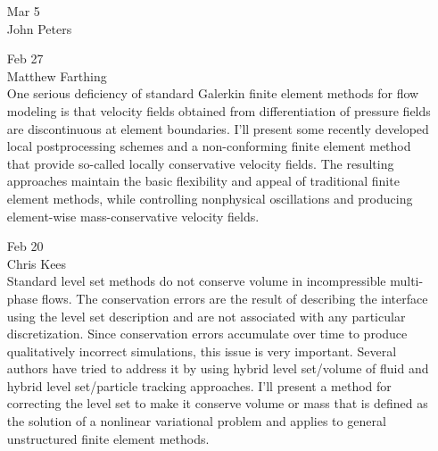 \documentclass[12]{article}
\begin{document}
\begin{enumerate}
\item[Mar 5] \\
  John Peters

\item[Feb 27] \\
  Matthew Farthing \\
  
  One serious deficiency of standard Galerkin finite element methods
  for flow modeling is that velocity fields obtained from
  differentiation of pressure fields are discontinuous at element
  boundaries. I'll present some recently developed local
  postprocessing schemes and a non-conforming finite element method
  that provide so-called locally conservative velocity fields. The
  resulting approaches maintain the basic flexibility and appeal of
  traditional finite element methods, while controlling nonphysical
  oscillations and producing element-wise mass-conservative velocity
  fields. 

\item[Feb 20] \\
  Chris Kees\\
  Standard level set methods do not conserve volume in incompressible
  multi-phase flows. The conservation errors are the result of
  describing the interface using the level set description and are not
  associated with any particular discretization. Since conservation
  errors accumulate over time to produce qualitatively incorrect
  simulations, this issue is very important. Several authors have
  tried to address it by using hybrid level set/volume of fluid and
  hybrid level set/particle tracking approaches. I'll present a method
  for correcting the level set to make it conserve volume or mass that
  is defined as the solution of a nonlinear variational problem and
  applies to general unstructured finite element methods.

\end{enumerate}
\end{document}
